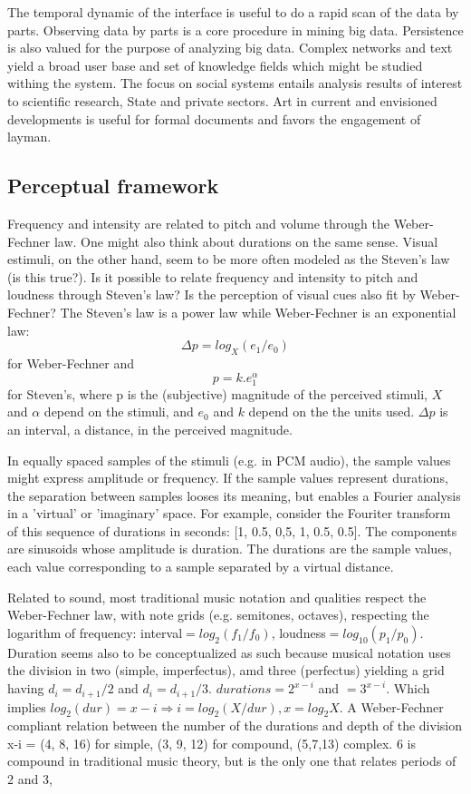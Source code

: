 \documentclass[letterpaper,10pt]{article}
\begin{document}
The temporal dynamic of the interface is useful to do a rapid scan of the data by parts.
Observing data by parts is a core procedure in mining big data.
Persistence is also valued for the purpose of analyzing big data.
Complex networks and text yield a broad user base
and set of knowledge fields which might be studied withing the system.
The focus on social systems entails analysis results of interest
to scientific research, State and private sectors.
Art in current and envisioned developments
is useful for formal documents and favors the engagement
of layman.

\subsection{Perceptual framework}
Frequency and intensity are related to pitch and volume
through the Weber-Fechner law.
One might also think about durations on the same sense.
Visual estimuli, on the other hand, seem to be 
more often modeled as the Steven's law (is this true?).
Is it possible to relate frequency and intensity to
pitch and loudness through Steven's law?
Is the perception of visual cues also fit by Weber-Fechner?
The Steven's law is a power law while Weber-Fechner is an exponential
law:
\begin{equation}
	\Delta p = log_X(e_1/e_0)
\end{equation}
\noindent for Weber-Fechner and
\begin{equation}
	p = k.e_1^\alpha
\end{equation}
\noindent for Steven's,
where p is the (subjective) magnitude of the perceived stimuli,
$X$ and $\alpha$ depend on the stimuli,
and $e_0$ and $k$ depend on the the units used.
$\Delta p$ is an interval, a distance, in the perceived magnitude.

In equally spaced samples of the stimuli (e.g. in PCM audio),
the sample values might express amplitude or frequency.
If the sample values represent durations, the separation
between samples looses its meaning, but enables a Fourier
analysis in a 'virtual' or 'imaginary' space.
For example, consider the Fouriter transform of
this sequence of durations in seconds:
[1, 0.5, 0,5, 1, 0.5, 0.5].
The components are sinusoids whose amplitude
is duration.
The durations are the sample values,
each value corresponding to a sample separated
by a virtual distance.

Related to sound, most traditional music notation and qualities
respect the Weber-Fechner law, with note grids (e.g. semitones, octaves),
respecting the logarithm of frequency: interval$=log_2(f_1/f_0)$,
loudness$=log_10(p_1/p_0)$.
Duration seems also to be conceptualized as such
because musical notation uses the division in two (simple, imperfectus),
amd three (perfectus) yielding a grid having
$d_i=d_{i+1}/2$ and $d_i=d_{i+1}/3$.
$durations=2^{x-i}$ and $=3^{x-i}$.
Which implies $log_2(dur) = x-i \Rightarrow i = log_2(X/dur), x = log_2X$.
A Weber-Fechner compliant relation
between the number of the durations and
depth of the division x-i = (4, 8, 16) for simple,
(3, 9, 12) for compound,
(5,7,13) complex.
6 is compound in traditional music theory,
but is the only one that relates periods of 2 and 3,
\end{document}

